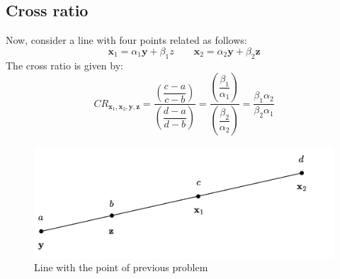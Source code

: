 \subsection{Cross ratio}
Now, consider a line with four points related as follows:
\[\mathbf{x}_1=\alpha_1\mathbf{y}+\beta_1z \qquad \mathbf{x}_2=\alpha_2\mathbf{y}+\beta_2\mathbf{z}\]
The cross ratio is given by:
\[CR_{\mathbf{x}_1,\mathbf{x}_2,\mathbf{y},\mathbf{z}}=\dfrac{\left(\dfrac{c-a}{c-b}\right)}{\left(\dfrac{d-a}{d-b}\right)}=\dfrac{\left(\dfrac{\beta_1}{\alpha_1}\right)}{\left(\dfrac{\beta_2}{\alpha_2}\right)}=\dfrac{\beta_1\alpha_2}{\beta_2\alpha_1}\]
\begin{figure}[H]
    \centering
    \includegraphics[width=0.5\linewidth]{images/line.png}
    \caption{Line with the point of previous problem}
\end{figure}
